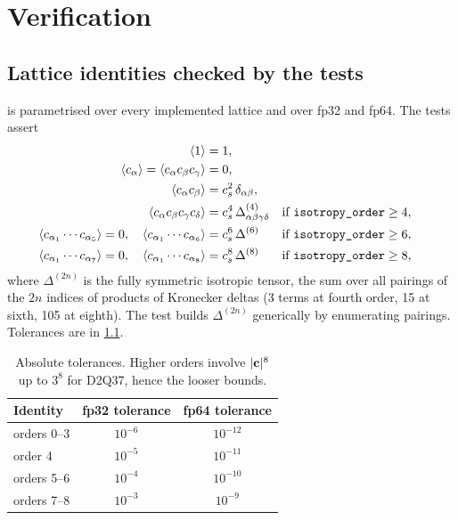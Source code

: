 
\chapter{Verification}

\label{Chapter6}


\section{Lattice identities checked by the tests}

 is parametrised over every implemented lattice and over
fp32 and fp64. The tests assert
\begin{align}
\langle 1 \rangle &= 1, \\
\langle c_\alpha \rangle = \langle c_\alpha c_\beta c_\gamma \rangle &= 0, \\
\langle c_\alpha c_\beta \rangle &= c_s^2\,\delta_{\alpha\beta}, \\
\langle c_\alpha c_\beta c_\gamma c_\delta \rangle &= c_s^4\,\Delta^{(4)}_{\alpha\beta\gamma\delta}
  &&\text{if } \texttt{isotropy\_order} \ge 4, \\
\langle c_{\alpha_1}\cdots c_{\alpha_5} \rangle = 0,\quad
\langle c_{\alpha_1}\cdots c_{\alpha_6} \rangle &= c_s^6\,\Delta^{(6)}
  &&\text{if } \texttt{isotropy\_order} \ge 6, \\
\langle c_{\alpha_1}\cdots c_{\alpha_7} \rangle = 0,\quad
\langle c_{\alpha_1}\cdots c_{\alpha_8} \rangle &= c_s^8\,\Delta^{(8)}
  &&\text{if } \texttt{isotropy\_order} \ge 8,
\end{align}
where $\Delta^{(2n)}$ is the fully symmetric isotropic tensor, the sum over all pairings of
the $2n$ indices of products of Kronecker deltas (3 terms at fourth order, 15 at sixth, 105
at eighth). The test builds $\Delta^{(2n)}$ generically by enumerating pairings. Tolerances
are in \cref{tab:tolerances}.

\begin{table}[h]
\centering\small
\begin{tabular}{@{}lcc@{}}
\toprule
Identity & fp32 tolerance & fp64 tolerance \\
\midrule
orders 0--3 & $10^{-6}$ & $10^{-12}$ \\
order 4     & $10^{-5}$ & $10^{-11}$ \\
orders 5--6 & $10^{-4}$ & $10^{-10}$ \\
orders 7--8 & $10^{-3}$ & $10^{-9}$ \\
\bottomrule
\end{tabular}
\caption{Absolute tolerances. Higher orders involve $|\mathbf{c}|^{8}$ up to $3^8$ for D2Q37, hence
the looser bounds.}
\label{tab:tolerances}
\end{table}

